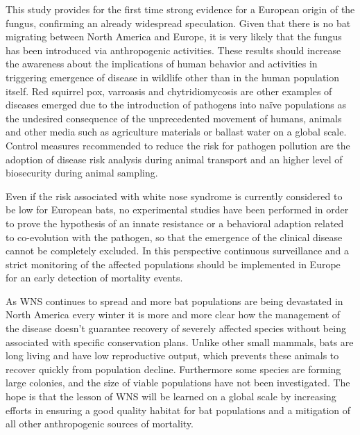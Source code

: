 {This study provides for the first time strong evidence for a European origin of the fungus, confirming an already widespread speculation. Given that there is no bat migrating between North America and Europe, it is very likely that the fungus has been introduced via anthropogenic activities. These results should increase the awareness about the implications of human behavior and activities in triggering emergence of disease in wildlife other than in the human population itself. Red squirrel pox, varroasis and chytridiomycosis are other examples of diseases emerged due to the introduction of pathogens into naïve populations as the undesired consequence of the unprecedented movement of humans, animals and other media such as agriculture materials or ballast water on a global scale. Control measures recommended to reduce the risk for pathogen pollution are the adoption of disease risk analysis during animal transport and an higher level of biosecurity during animal sampling. 

Even if the risk associated with white nose syndrome is currently considered to be low for European bats, no experimental studies have been performed in order to prove the hypothesis of an innate resistance or a behavioral adaption related to co-evolution with the pathogen, so that the emergence of the clinical disease cannot be completely excluded. In this perspective continuous surveillance and a strict monitoring of the affected populations should be implemented in Europe for an early detection of mortality events. 

As WNS continues to spread and more bat populations are being devastated in North America every winter it is more and more clear how the management of the disease doesn’t guarantee recovery of severely affected species without being associated with specific conservation plans. Unlike other small mammals, bats are long living and have low reproductive output, which prevents these animals to recover quickly from population decline. Furthermore some species are forming large colonies, and the size of viable populations have not been investigated. The hope is that the lesson of WNS will be learned on a global scale by increasing efforts in ensuring a good quality habitat for bat populations and a mitigation of all other anthropogenic sources of mortality.
} %